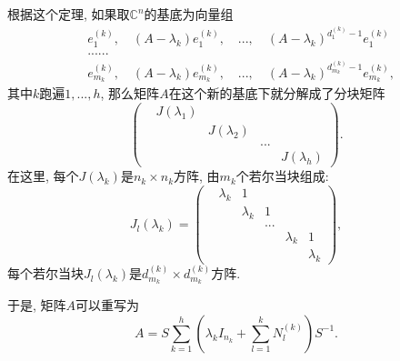 根据这个定理, 如果取$\mathbb{C}^n$的基底为向量组
$$
\begin{aligned}
&e^{(k)}_1,\quad(A-\lambda_k)e^{(k)}_1,\quad...,\quad(A-\lambda_k)^{d^{(k)}_1-1}e^{(k)}_1\\
&......\\
&e^{(k)}_{m_k},\quad(A-\lambda_k)e^{(k)}_{m_k},\quad...,\quad(A-\lambda_k)^{d^{(k)}_{m_k}-1}e^{(k)}_{m_k},
\end{aligned}
$$
其中$k$跑遍$1,...,h$, 那么矩阵$A$在这个新的基底下就分解成了分块矩阵
$$
\left(
\begin{matrix}
&J(\lambda_1) &  & & \\
& &J(\lambda_2) & & \\
& & &...\\
& & & & J(\lambda_h)
\end{matrix}
\right).
$$
在这里, 每个$J(\lambda_k)$是$n_k\times n_k$方阵, 由$m_k$个若尔当块组成:
$$
J_l(\lambda_k)
=\left(
\begin{matrix}
&\lambda_k & 1 & & & \\
& &\lambda_k & 1 & & \\
& & &...\\
& & & & \lambda_k & 1\\
& & & & & \lambda_k
\end{matrix}
\right),
$$
每个若尔当块$J_l(\lambda_k)$是$d_{m_k}^{(k)}\times d_{m_k}^{(k)}$方阵.

于是, 矩阵$A$可以重写为
$$
A=S\sum_{k=1}^h\left(\lambda_kI_{n_k}+\sum_{l=1}^k N_l^{(k)}\right)S^{-1}.
$$